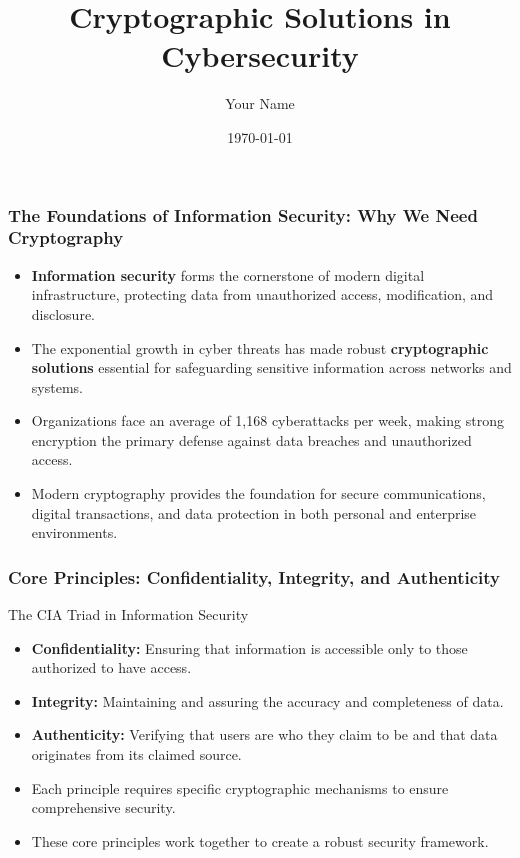 \documentclass{beamer}
\title{Cryptographic Solutions in Cybersecurity}
\author{Your Name}
\institute{Institution Name}
\date{\today}
\begin{document}
\begin{frame}
    \titlepage
\end{frame}

\begin{frame}
    \frametitle{The Foundations of Information Security: Why We Need Cryptography}
    
    \begin{itemize}
        \item \textbf{Information security} forms the cornerstone of modern digital infrastructure, protecting data from unauthorized access, modification, and disclosure.
        
        \item The exponential growth in cyber threats has made robust \textbf{cryptographic solutions} essential for safeguarding sensitive information across networks and systems.
        
        \item Organizations face an average of 1,168 cyberattacks per week, making strong encryption the primary defense against data breaches and unauthorized access.
        
        \item Modern cryptography provides the foundation for secure communications, digital transactions, and data protection in both personal and enterprise environments.
    \end{itemize}
\end{frame}

\begin{frame}
    \frametitle{Core Principles: Confidentiality, Integrity, and Authenticity}
    
    \begin{block}{The CIA Triad in Information Security}
        \begin{itemize}
            \item \textbf{Confidentiality:} Ensuring that information is accessible only to those authorized to have access.
            
            \item \textbf{Integrity:} Maintaining and assuring the accuracy and completeness of data.
            
            \item \textbf{Authenticity:} Verifying that users are who they claim to be and that data originates from its claimed source.
        \end{itemize}
    \end{block}
    
    \begin{itemize}
        \item Each principle requires specific cryptographic mechanisms to ensure comprehensive security.
        
        \item These core principles work together to create a robust security framework.
    \end{itemize}
\end{frame}
\end{document}
